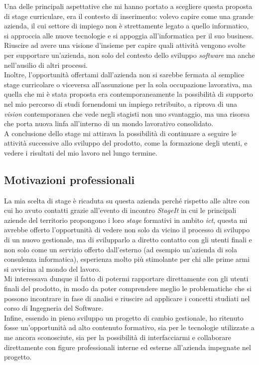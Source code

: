 Una delle principali aspettative che mi hanno portato a scegliere questa proposta di stage curriculare, era il contesto di inserimento: volevo capire come una grande azienda, il cui settore di impiego non è strettamente legato a quello informatico, si approccia alle nuove tecnologie e si appoggia all'informatica per il suo business. 
\\
Riuscire ad avere una visione d'insieme per capire quali attività vengono svolte per supportare un'azienda, non solo del contesto dello sviluppo \textit{software} ma anche nell'ausilio di altri processi.
\\
Inoltre, l'opportunità offertami dall'azienda non si sarebbe fermata al semplice stage curricolare o viceversa all'assunzione per la sola occupazione lavorativa, ma quella che mi è stata proposta era contemporaneamente la possibilità di supporto nel mio percorso di studi fornendomi un impiego retribuito, a riprova di una \textit{vision} contemporanea che vede negli stagisti non uno svantaggio, ma una risorsa che porta nuova linfa all'interno di un mondo lavorativo consolidato.
\\
A conclusione dello stage mi attirava la possibilità di continuare a seguire le attività successive allo sviluppo del prodotto, come la formazione degli utenti, e vedere i risultati del mio lavoro nel lungo termine.

\subsection{Motivazioni professionali}

La mia scelta di stage è ricaduta su questa azienda perché rispetto alle altre con cui ho avuto contatti grazie all'evento di incontro \textit{StageIt} in cui le principali aziende del territorio propongono i loro \textit{stage} formativi in ambito \textit{\gls{ict}\glsfirstoccur}, questa mi avrebbe offerto l'opportunità di vedere non solo da vicino il processo di sviluppo di un nuovo gestionale, ma di svilupparlo a diretto contatto con gli utenti finali e non solo come un servizio offerto dall'esterno (ad esempio un'azienda di sola consulenza informatica), esperienza molto più stimolante per chi alle prime armi si avvicina al mondo del lavoro.
\\
Mi interessava dunque il fatto di potermi rapportare direttamente con gli utenti finali del prodotto, in modo da poter comprendere meglio le problematiche che si possono incontrare in fase di analisi e riuscire ad applicare i concetti studiati nel corso di Ingegneria del Software. 
\\ 
Infine, essendo in pieno sviluppo un progetto di cambio gestionale, ho ritenuto fosse un'opportunità ad alto contenuto formativo, sia per le tecnologie utilizzate a me ancora sconosciute, sia per la possibilità di interfacciarmi e collaborare direttamente con figure professionali interne ed esterne all'azienda impegnate nel progetto.
